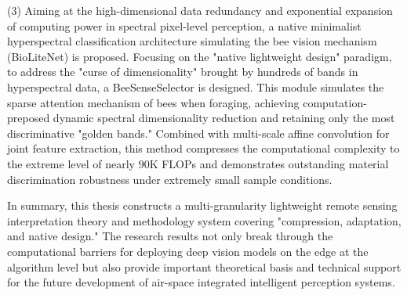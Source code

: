 \begin{eabstract}
(3) Aiming at the high-dimensional data redundancy and exponential expansion of computing power in spectral pixel-level perception, a native minimalist hyperspectral classification architecture simulating the bee vision mechanism (BioLiteNet) is proposed. Focusing on the "native lightweight design" paradigm, to address the "curse of dimensionality" brought by hundreds of bands in hyperspectral data, a BeeSenseSelector is designed. This module simulates the sparse attention mechanism of bees when foraging, achieving computation-preposed dynamic spectral dimensionality reduction and retaining only the most discriminative "golden bands." Combined with multi-scale affine convolution for joint feature extraction, this method compresses the computational complexity to the extreme level of nearly 90K FLOPs and demonstrates outstanding material discrimination robustness under extremely small sample conditions.

In summary, this thesis constructs a multi-granularity lightweight remote sensing interpretation theory and methodology system covering "compression, adaptation, and native design." The research results not only break through the computational barriers for deploying deep vision models on the edge at the algorithm level but also provide important theoretical basis and technical support for the future development of air-space integrated intelligent perception systems.

\end{eabstract}


